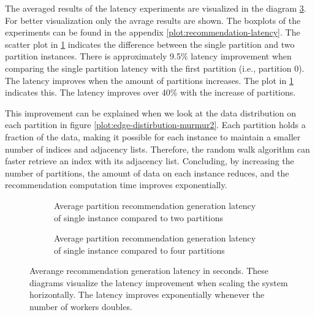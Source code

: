 The averaged results of the latency experiments are visualized in the diagram \ref{plot:average-recommendation-latency}. For better visualization only the avrage results are shown. The boxplots of the experiments can be found in the appendix \ref{plot:recommendation-latency}. The scatter plot in \ref{plot:average-recommendation-latency-two-partitions} indicates the difference between the single partition and two partition instances. There is approximately 9.5\% latency improvement when comparing the single partition latency with the first partition (i.e., partition 0). The latency improves when the amount of partitions increases. The plot in \ref{plot:average-recommendation-latency-two-partitions} indicates this. The latency improves over 40\% with the increase of partitions.

This improvement can be explained when we look at the data distribution on each partition in figure \ref{plot:edge-distirbution-murmur2}. Each partition holds a fraction of the data, making it possible for each instance to maintain a smaller number of indices and adjacency lists. Therefore, the random walk algorithm can faster retrieve an index with its adjacency list. Concluding, by increasing the number of partitions, the amount of data on each instance reduces, and the recommendation computation time improves exponentially.


\begin{figure}[!htb]
    \centering
    \begin{subfigure}{\textwidth}
        \centering
        
        \caption{Average partition recommendation generation latency of single instance compared to two partitions}
        \label{plot:average-recommendation-latency-two-partitions}
    \end{subfigure}\qquad

    \begin{subfigure}{\textwidth}
        \centering
        
        \caption{Average partition recommendation generation latency of single instance compared to four partitions}
        \label{plot:average-recommendation-latency-four-partitions}
    \end{subfigure}\qquad
    \caption{Averange recommendation generation latency in seconds. These diagrams visualize the latency improvement when scaling the system horizontally. The latency improves exponentially whenever the number of workers doubles.}
    \label{plot:average-recommendation-latency}
\end{figure}



